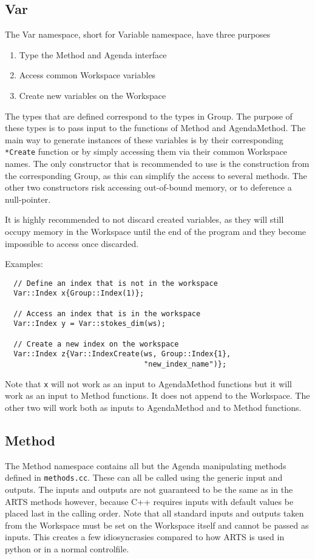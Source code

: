 \subsection{Var}
\label{sec:cpp_api:usage:variable}
The Var namespace, short for Variable namespace, have three purposes
\begin{enumerate}
 \item Type the Method and Agenda interface
 \item Access common Workspace variables
 \item Create new variables on the Workspace
\end{enumerate}
The types that are defined correspond to the types in Group.
The purpose of these types is to pass input to the functions of
Method and AgendaMethod.  The main way to generate
instances of these variables is by their corresponding \verb|*Create|
function or by simply accessing them via their common Workspace
names.  The only constructor that is recommended to use is the
construction from the corresponding Group, as this can simplify
the access to several methods.  The other two constructors risk
accessing out-of-bound memory, or to deference a null-pointer.

It is highly recommended to not discard created variables, as they
will still occupy memory in the Workspace until the end of the program
and they become impossible to access once discarded.

Examples:
\begin{verbatim}
  // Define an index that is not in the workspace
  Var::Index x{Group::Index(1)};
  
  // Access an index that is in the workspace
  Var::Index y = Var::stokes_dim(ws);
  
  // Create a new index on the workspace
  Var::Index z{Var::IndexCreate(ws, Group::Index{1},
                                "new_index_name")};
\end{verbatim}
Note that \verb|x| will not work as an input to AgendaMethod functions
but it will work as an input to Method functions.  It does not append
to the Workspace.  The other two will work both as inputs to
AgendaMethod and to Method functions.

\subsection{Method}
\label{sec:cpp_api:usage:method}
The Method namespace contains all but the Agenda manipulating methods
defined in \verb|methods.cc|.  These can all be called using the generic
input and outputs.  The inputs and outputs are not guaranteed to be the
same as in the ARTS methods however, because C++ requires inputs with 
default values be placed last in the calling order.  Note that all 
standard inputs and outputs taken from the Workspace must be set on the
Workspace itself and cannot be passed as inputs.  This creates a few
idiosyncrasies compared to how ARTS is used in python or in a normal
controlfile.  

